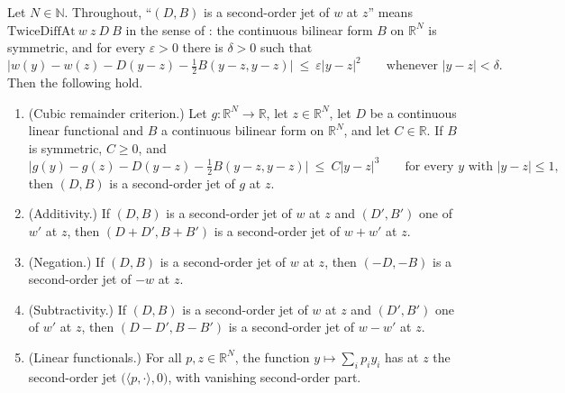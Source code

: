 \begin{lemma}
Let $N\in\mathbb N$. Throughout, ``$(D,B)$ is a second-order jet of $w$ at $z$'' means
$\mathrm{TwiceDiffAt}\ w\ z\ D\ B$ in the sense of : the continuous
bilinear form $B$ on $\mathbb R^{N}$ is symmetric, and for every $\varepsilon>0$ there is
$\delta>0$ such that
\[
 \Big|w(y)-w(z)-D(y-z)-\tfrac12B(y-z,y-z)\Big|\ \le\ \varepsilon|y-z|^{2}
 \qquad\text{whenever }|y-z|<\delta .
\]
Then the following hold.
\begin{enumerate}
\item (Cubic remainder criterion.) Let $g:\mathbb R^{N}\to\mathbb R$, let
  $z\in\mathbb R^{N}$, let $D$ be a continuous linear functional and $B$ a continuous
  bilinear form on $\mathbb R^{N}$, and let $C\in\mathbb R$. If $B$ is symmetric,
  $C\ge0$, and
  \[
   \Big|g(y)-g(z)-D(y-z)-\tfrac12B(y-z,y-z)\Big|\ \le\ C|y-z|^{3}
   \qquad\text{for every }y\text{ with }|y-z|\le1,
  \]
  then $(D,B)$ is a second-order jet of $g$ at $z$.
\item (Additivity.) If $(D,B)$ is a second-order jet of $w$ at $z$ and $(D',B')$ one of
  $w'$ at $z$, then $(D+D',B+B')$ is a second-order jet of $w+w'$ at $z$.
\item (Negation.) If $(D,B)$ is a second-order jet of $w$ at $z$, then $(-D,-B)$ is a
  second-order jet of $-w$ at $z$.
\item (Subtractivity.) If $(D,B)$ is a second-order jet of $w$ at $z$ and $(D',B')$ one of
  $w'$ at $z$, then $(D-D',B-B')$ is a second-order jet of $w-w'$ at $z$.
\item (Linear functionals.) For all $p,z\in\mathbb R^{N}$, the function
  $y\mapsto\sum_{i}p_iy_i$ has at $z$ the second-order jet $\big(\langle p,\cdot\rangle,0\big)$,
  with vanishing second-order part.
\end{enumerate}
\end{lemma}
